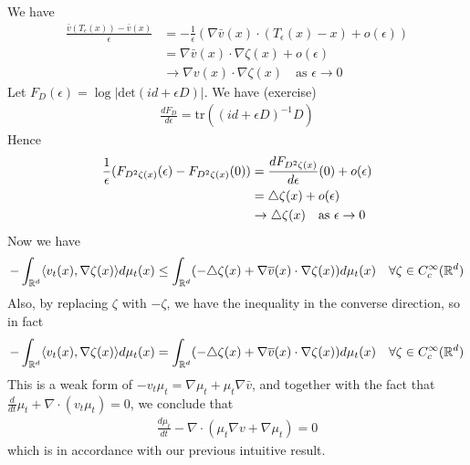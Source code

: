 \documentclass[12pt,a4paper]{article}
\begin{document}
We have 
\begin{align*}
\frac{\bar{v}(T_{\epsilon}(x)) - \bar{v}(x)}{\epsilon} &= - \frac{1}{\epsilon} (\nabla \bar{v}(x) \cdot(T_{\epsilon}(x) -x) + o(\epsilon)) \\
&= \nabla \bar{v} (x) \cdot \nabla \zeta(x) + o(\epsilon)\\
&\rightarrow \nabla v(x) \cdot \nabla \zeta(x) \quad \text{as } \epsilon \rightarrow 0
\end{align*}
Let $F_D(\epsilon) = \log |\text{det}(id + \epsilon D)|$. We have (exercise)
\begin{align*}
\frac{dF_D}{d\epsilon} = \text{tr}((id+\epsilon D)^{-1} D)
\end{align*}
Hence
\begin{align*}
\frac{1}{\epsilon} (F_{D^2 \zeta(x)}(\epsilon) - F_{D^2 \zeta(x)}(0)) &= \frac{dF_{D^2\zeta(x)}}{d\epsilon}(0) + o(\epsilon) \\
&= \triangle \zeta(x) + o(\epsilon) \\
&\rightarrow \triangle \zeta(x) \quad \text{as }\epsilon \rightarrow 0
\end{align*}
Now we have
\begin{align*}
-\int_{\mathbb{R}^d} \langle v_t(x), \nabla \zeta(x) \rangle d\mu_t(x) \leq \int_{\mathbb{R}^d} (-\triangle \zeta(x) + \nabla \overline{v}(x) \cdot \nabla \zeta(x))d\mu_t(x) \quad \forall \zeta \in C_c^{\infty}(\mathbb{R}^d)
\end{align*}
Also, by replacing $\zeta$ with $-\zeta$, we have the inequality in the converse direction, so in fact
\begin{align*}
-\int_{\mathbb{R}^d} \langle v_t(x), \nabla \zeta(x) \rangle d\mu_t(x) = \int_{\mathbb{R}^d} (-\triangle \zeta(x) + \nabla \overline{v}(x) \cdot \nabla \zeta(x))d\mu_t(x) \quad \forall \zeta \in C_c^{\infty}(\mathbb{R}^d)
\end{align*}
This is a weak form of $-v_t \mu_t = \nabla \mu_t + \mu_t \nabla \bar{v}$, and together with the fact that $\frac{d}{dt} \mu_t + \nabla \cdot (v_t \mu_t) =0$, we conclude that
\begin{align*}
\frac{d\mu_t}{dt} -\nabla \cdot(\mu_t \nabla v + \nabla \mu_t) =0
\end{align*}
which is in accordance with our previous intuitive result.
\end{document}
